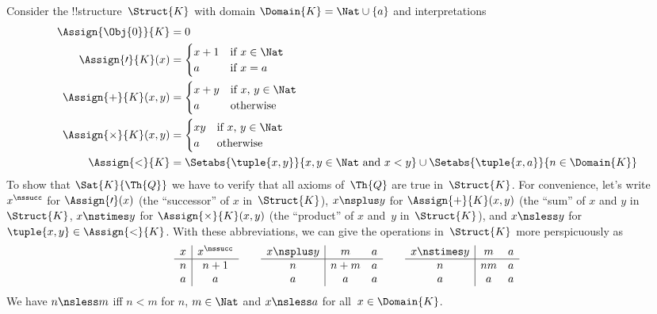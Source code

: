 \documentclass[../../../include/open-logic-section]{subfiles}
\begin{document}
\begin{ex}
Consider the !!{structure}~$\Struct{K}$ with domain $\Domain{K} = \Nat
\cup \{a\}$ and interpretations
\begin{align*}
  \Assign{\Obj{0}}{K} & = 0\\
  \Assign{\prime}{K}(x) & =
  \begin{cases}
    x+1 & \text{if $x\in \Nat$}\\
    a & \text{if $x = a$}
  \end{cases}\\
  \Assign{+}{K}(x, y) & =
  \begin{cases}
    x+y & \text{if $x$, $y \in\Nat$}\\
    a & \text{otherwise}
  \end{cases}\\
  \Assign{\times}{K}(x, y) & =
  \begin{cases}
    xy & \text{if $x$, $y \in\Nat$}\\
    a & \text{otherwise}\\
  \end{cases}\\
  \Assign{<}{K} & =
  \Setabs{\tuple{x,y}}{x, y \in \Nat \text{ and } x<y} \cup
  \Setabs{\tuple{x,a}}{n \in \Domain{K}}
\end{align*}
To show that $\Sat{K}{\Th{Q}}$ we have to verify that all axioms
of~$\Th{Q}$ are true in~$\Struct{K}$.  For convenience, let's write
$x^\nssucc$ for $\Assign{\prime}(x)$ (the ``successor'' of $x$
in~$\Struct{K}$), $x \nsplus y$ for $\Assign{+}{K}(x, y)$ (the ``sum''
of $x$ and $y$ in~$\Struct{K}$, $x \nstimes y$ for
$\Assign{\times}{K}(x, y)$ (the ``product'' of $x$ and~$y$
in~$\Struct{K}$), and $x \nsless y$ for $\tuple{x,y} \in
\Assign{<}{K}$. With these abbreviations, we can give the operations
in~$\Struct{K}$ more perspicuously as
\[
\begin{array}{c|c}
  x & x^\nssucc \\
  \hline
  n & n+1 \\
  a & a
\end{array}
\qquad
\begin{array}{c|ccc}
  x \nsplus y & m & a \\
  \hline
  n & n+m & a \\
  a & a & a \\
\end{array}
\qquad
\begin{array}{c|ccc}
  x \nstimes y & m & a \\
  \hline
  n & nm & a \\
  a & a & a \\
\end{array}
\]
We have $n \nsless m$ iff $n<m$ for $n$, $m \in \Nat$ and $x \nsless
a$ for all~$x \in \Domain{K}$.


\end{ex}
\end{document}
